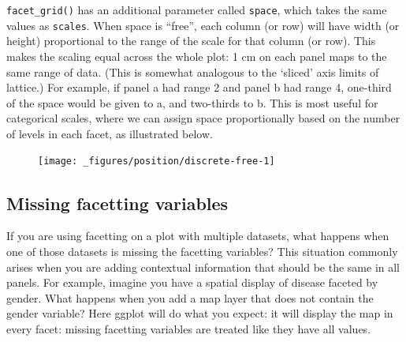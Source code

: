 \texttt{facet\_grid()} has an additional parameter called
\texttt{space}, which takes the same values as \texttt{scales}. When
space is ``free'', each column (or row) will have width (or height)
proportional to the range of the scale for that column (or row). This
makes the scaling equal across the whole plot: 1 cm on each panel maps
to the same range of data. (This is somewhat analogous to the `sliced'
axis limits of lattice.) For example, if panel a had range 2 and panel b
had range 4, one-third of the space would be given to a, and two-thirds
to b. This is most useful for categorical scales, where we can assign
space proportionally based on the number of levels in each facet, as
illustrated below.

\begin{Shaded}
\begin{Highlighting}[]
\StringTok{ }
\StringTok{ }
\StringTok{ }
\StringTok{  }\NormalTok{() +}\StringTok{ }
\StringTok{  }\StringTok{ } \NormalTok{, } \NormalTok{) +}
\StringTok{  }\NormalTok{(} \NormalTok{(} \NormalTok{))}
\end{Highlighting}
\end{Shaded}

\begin{figure}[H]
  \centering
  \texttt{[image: \_figures/position/discrete-free-1]}
\end{figure}

\subsection{Missing facetting
variables}\label{sub:missing-facetting-columns}

If you are using facetting on a plot with multiple datasets, what
happens when one of those datasets is missing the facetting variables?
This situation commonly arises when you are adding contextual
information that should be the same in all panels. For example, imagine
you have a spatial display of disease faceted by gender. What happens
when you add a map layer that does not contain the gender variable? Here
ggplot will do what you expect: it will display the map in every facet:
missing facetting variables are treated like they have all values.


